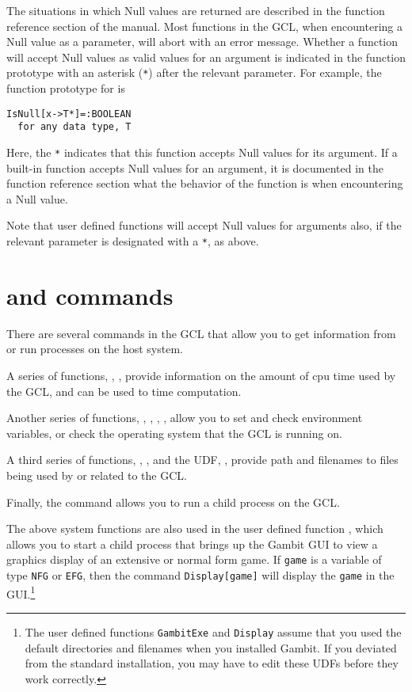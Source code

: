 The situations in which Null values are returned are described in the
function reference section of the manual.  Most functions in the GCL,
when encountering a Null value as a parameter, will abort with an
error message.  Whether a function will accept Null values as valid
values for an argument is indicated in the function prototype with an
asterisk (\verb+*+) after the relevant parameter.  For example, the
function prototype for  is

\begin{verbatim}
IsNull[x->T*]=:BOOLEAN
  for any data type, T
\end{verbatim}

Here, the \verb+*+ indicates that this function accepts Null values
for its argument.  If a built-in function accepts Null values for an
argument, it is documented in the function reference section what the
behavior of the function is when encountering a Null value.  

Note that user defined functions  will accept Null values for
arguments also, if the relevant parameter is designated with a
\verb+*+, as above. 

\section{ and commands}

There are several commands in the GCL that allow you to get
information from or run processes on the host system.  

A series of functions, , ,
 provide information on the amount of cpu time
used by the GCL, and can be used to time computation.  

Another series of functions, , ,
, , allow you to set and check
environment variables, or check the operating system that the GCL is
running on.

A third series of functions, , , and the
UDF, , provide path and filenames to files being used
by or related to the GCL.

Finally, the  command allows you to run a child process on
the GCL.  

The above system functions are also used in the user defined function
, which allows you to start a child process that brings
up the Gambit GUI to view a graphics display of an extensive or normal
form game. If \verb+game+ is a variable of type \verb+NFG+ or
\verb+EFG+, then the command \verb+Display[game]+ will display the
\verb+game+ in the GUI.\footnote{The user defined functions
\verb+GambitExe+ and \verb+Display+ assume that you used the default
directories and filenames when you installed Gambit.  If you deviated
from the standard installation, you may have to edit these UDFs
before they work correctly.}

